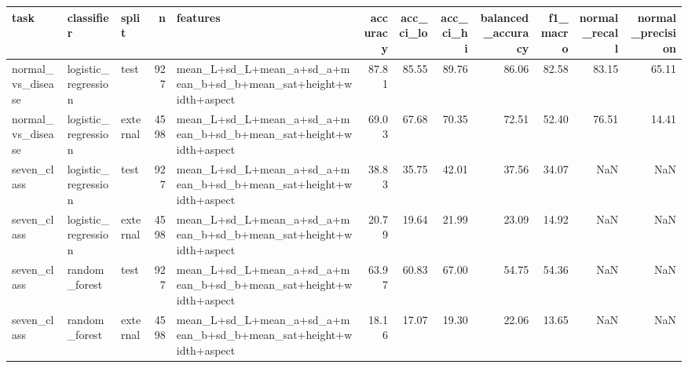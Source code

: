 \begin{tabular}{lllrlrrrrrrr}
\toprule
task & classifier & split & n & features & accuracy & acc\_ci\_lo & acc\_ci\_hi & balanced\_accuracy & f1\_macro & normal\_recall & normal\_precision \\
\midrule
normal\_vs\_disease & logistic\_regression & test & 927 & mean\_L+sd\_L+mean\_a+sd\_a+mean\_b+sd\_b+mean\_sat+height+width+aspect & 87.81 & 85.55 & 89.76 & 86.06 & 82.58 & 83.15 & 65.11 \\
normal\_vs\_disease & logistic\_regression & external & 4598 & mean\_L+sd\_L+mean\_a+sd\_a+mean\_b+sd\_b+mean\_sat+height+width+aspect & 69.03 & 67.68 & 70.35 & 72.51 & 52.40 & 76.51 & 14.41 \\
seven\_class & logistic\_regression & test & 927 & mean\_L+sd\_L+mean\_a+sd\_a+mean\_b+sd\_b+mean\_sat+height+width+aspect & 38.83 & 35.75 & 42.01 & 37.56 & 34.07 & NaN & NaN \\
seven\_class & logistic\_regression & external & 4598 & mean\_L+sd\_L+mean\_a+sd\_a+mean\_b+sd\_b+mean\_sat+height+width+aspect & 20.79 & 19.64 & 21.99 & 23.09 & 14.92 & NaN & NaN \\
seven\_class & random\_forest & test & 927 & mean\_L+sd\_L+mean\_a+sd\_a+mean\_b+sd\_b+mean\_sat+height+width+aspect & 63.97 & 60.83 & 67.00 & 54.75 & 54.36 & NaN & NaN \\
seven\_class & random\_forest & external & 4598 & mean\_L+sd\_L+mean\_a+sd\_a+mean\_b+sd\_b+mean\_sat+height+width+aspect & 18.16 & 17.07 & 19.30 & 22.06 & 13.65 & NaN & NaN \\
\bottomrule
\end{tabular}

